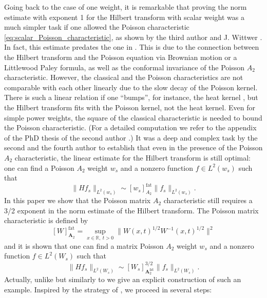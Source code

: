\documentclass{amsart}
\newcommand{\R}{\mathbb{R}}
\theoremstyle{definition}
\theoremstyle{remark}
\begin{document}
Going back to the case of one weight, it is remarkable that proving the norm estimate with exponent 1 for the Hilbert transform with scalar weight was a much simpler task if one allowed the Poisson characteristic \eqref{eq:scalar_Poisson_characteristic}, as shown by the third author and J. Wittwer \cite{PeWit}. In fact, this estimate predates the one in \cite{Pe}.
This is due to the connection between the Hilbert transform and the Poisson equation via Brownian motion or a Littlewood Paley formula, as well as the conformal invariance of the Poisson $A_2$ characteristic. However, the classical and the Poisson characteristics are not comparable with each other linearly due to the slow decay of the Poisson kernel. There is such a linear relation if one ``bumps'', for instance, the heat kernel \cite{PeVo}, but the Hilbert transform fits with the Poisson kernel, not the heat kernel. Even for simple power weights, the square of the classical characteristic is needed to bound the Poisson characteristic. (For a detailed computation we refer to the appendix of the PhD thesis of the second author \cite{Ka_PhD}.) It was a deep and complex task by the second and the fourth author \cite{KaTr} to establish that even in the presence of the Poisson $A_2$ characteristic, the linear estimate for the Hilbert transform is still optimal: one can find a Poisson $A_2$ weight $w_s$ and a nonzero function $f\in L^2(w_s)$ such that
$$\|Hf_s\|_{L^2(w_s)}\sim [w_s]_{{A}_2}^{\text{fat}}\|f_s\|_{L^2(w_s)}.$$
In this paper we show that the Poisson matrix $A_2$ characteristic still requires a 3/2 exponent in the norm estimate of the Hilbert transform. The Poisson matrix characteristic is defined by
$$ [W]_{\mathbf{A}_2}^{\text{fat}}=\sup_{x\in\R,~t>0}\|W(x,t)^{1/2}W^{-1}(x,t)^{1/2}\|^2$$ and it is shown that one can find a matrix Poisson $A_2$ weight $w_s$ and a nonzero function $f\in L^2(W_s)$ such that
$$\|Hf_s\|_{L^2(W_s)}\sim [W_s]_{\mathbf{A}_2^{\text{fat}}}^{3/2}\|f_s\|_{L^2(W_s)}.$$
Actually, unlike \cite{Na} but similarly to \cite{KaTr} we give an explicit construction of such an example. Inspired by the strategy of \cite{KaTr}, we proceed in several steps:
\end{document}
